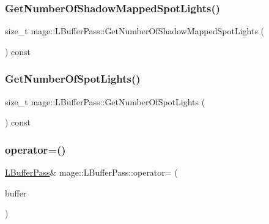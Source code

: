 \subsubsection{\texorpdfstring{Get\+Number\+Of\+Shadow\+Mapped\+Spot\+Lights()}{GetNumberOfShadowMappedSpotLights()}}
{\footnotesize\ttfamily size\+\_\+t mage\+::\+L\+Buffer\+Pass\+::\+Get\+Number\+Of\+Shadow\+Mapped\+Spot\+Lights (\begin{DoxyParamCaption}{ }\end{DoxyParamCaption}) const\hspace{0.3cm}{\ttfamily [noexcept]}}

\hypertarget{classmage_1_1_l_buffer_pass_a52e32579e9843f3d6cf998cbf9a3f362}{}\label{classmage_1_1_l_buffer_pass_a52e32579e9843f3d6cf998cbf9a3f362} 
\subsubsection{\texorpdfstring{Get\+Number\+Of\+Spot\+Lights()}{GetNumberOfSpotLights()}}
{\footnotesize\ttfamily size\+\_\+t mage\+::\+L\+Buffer\+Pass\+::\+Get\+Number\+Of\+Spot\+Lights (\begin{DoxyParamCaption}{ }\end{DoxyParamCaption}) const\hspace{0.3cm}{\ttfamily [noexcept]}}

\hypertarget{classmage_1_1_l_buffer_pass_aec86026cd14a4b1609f709444bc453bd}{}\label{classmage_1_1_l_buffer_pass_aec86026cd14a4b1609f709444bc453bd} 
\subsubsection{\texorpdfstring{operator=()}{operator=()}\hspace{0.1cm}{\footnotesize\ttfamily [1/2]}}
{\footnotesize\ttfamily \hyperlink{classmage_1_1_l_buffer_pass}{L\+Buffer\+Pass}\& mage\+::\+L\+Buffer\+Pass\+::operator= (\begin{DoxyParamCaption}\item[{const \hyperlink{classmage_1_1_l_buffer_pass}{L\+Buffer\+Pass} \&}]{buffer }\end{DoxyParamCaption})\hspace{0.3cm}{\ttfamily [delete]}}

